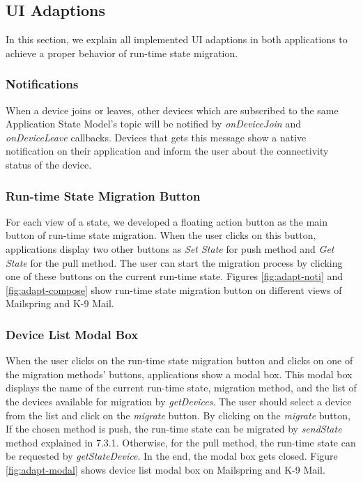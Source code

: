 \subsection{UI Adaptions}
In this section, we explain all implemented UI adaptions in both applications to achieve a proper behavior of run-time state migration. 

\subsubsection{Notifications}
When a device joins or leaves, other devices which are subscribed to the same Application State Model's topic will be notified by \textit{onDeviceJoin} and \textit{onDeviceLeave} callbacks. Devices that gets this message show a native notification on their application and inform the user about the connectivity status of the device.

\subsubsection{Run-time State Migration Button}
For each view of a state, we developed a floating action button as the main button of run-time state migration. When the user clicks on this button, applications display two other buttons as \textit{Set State} for push method and \textit{Get State} for the pull method. The user can start the migration process by clicking one of these buttons on the current run-time state. Figures \ref{fig:adapt-noti} and \ref{fig:adapt-compose} show run-time state migration button on different views of Mailspring and K-9 Mail. 

\subsubsection{Device List Modal Box}
When the user clicks on the run-time state migration button and clicks on one of the migration methods' buttons, applications show a modal box. This modal box displays the name of the current run-time state, migration method, and the list of the devices available for migration by \textit{getDevices}. The user should select a device from the list and click on the \textit{migrate} button. By clicking on the \textit{migrate} button, If the chosen method is push, the run-time state can be migrated by \textit{sendState} method explained in 7.3.1. Otherwise, for the pull method, the run-time state can be requested by \textit{getStateDevice}. In the end, the modal box gets closed. Figure \ref{fig:adapt-modal} shows device list modal box on Mailspring and K-9 Mail.

